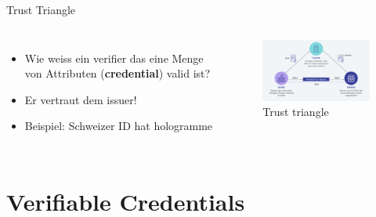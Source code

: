 \documentclass[
	german,%
	authorontitle=true,
	]{bfhbeamer}
\begin{document}
\begin{frame}{Trust Triangle}
    \begin{columns}[onlytextwidth,T]
        \column{70mm}  
        \begin{itemize}
            \item Wie weiss ein verifier das eine Menge von Attributen (\textbf{credential}) valid ist?
            \item Er vertraut dem issuer!
            \item Beispiel: Schweizer ID hat hologramme
        \end{itemize}

        \column{70mm}

        \begin{figure}
            \centering
            \includegraphics[width=70mm]{../img/trusttriangle.png}
            \caption{Trust triangle}
        \end{figure}
        
    \end{columns}
\end{frame}

\section{Verifiable Credentials}
\end{document}
